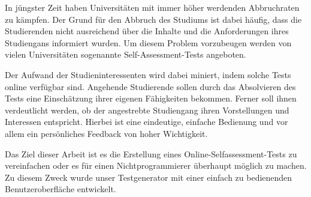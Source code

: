 \label{Einleitung-und-Motivation}
In jüngster Zeit haben Universitäten mit immer höher werdenden Abbruchraten zu kämpfen. 
Der Grund für den Abbruch des Studiums ist dabei häufig, dass die Studierenden nicht ausreichend über die Inhalte und die Anforderungen ihres Studiengans informiert wurden.
Um diesem Problem vorzubeugen werden von vielen Universitäten sogenannte Self-Assessment-Tests angeboten.

Der Aufwand der Studieninteressenten wird dabei miniert, indem solche Tests online verfügbar sind.
Angehende Studierende sollen durch das Absolvieren des Tests eine Einschätzung ihrer eigenen Fähigkeiten bekommen. 
Ferner soll ihnen verdeutlicht werden, ob der angestrebte Studiengang ihren Vorstellungen und Interessen entspricht.
Hierbei ist eine eindeutige, einfache Bedienung und vor allem ein persönliches Feedback von hoher Wichtigkeit. 

Das Ziel dieser Arbeit ist es die Erstellung eines Online-Selfassessment-Tests zu vereinfachen oder es für einen Nichtprogrammierer überhaupt möglich zu machen. 
Zu diesem Zweck wurde unser Testgenerator mit einer einfach zu bedienenden Benutzeroberfläche entwickelt.